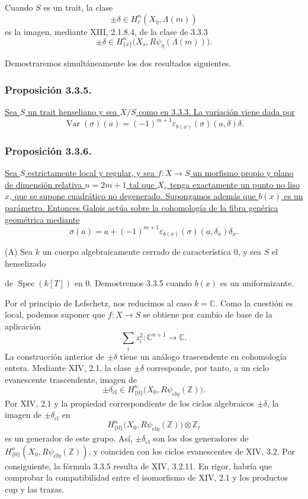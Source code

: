 Cuando $S$ es un trait, la clase
\[
\pm\delta\in H_c^n(X_{\bar\eta},\Lambda(m))
\]
es la imagen, mediante XIII, 2.1.8.4, de la clase de 3.3.3
\[
\pm\delta\in
H^n_{\{x\}}\bigl(X_s,R\psi_{\bar\eta}(\Lambda(m))\bigr).
\]

Demostraremos simultáneamente los dos resultados siguientes.

\subsubsection*{Proposición 3.3.5.}
\underline{Sea $S$ un trait henseliano y sea $X/S$ como en 3.3.3. La
variación viene dada por}
\[
\operatorname{Var}(\sigma)(a)
=(-1)^{m+1}\varepsilon_{b(x)}(\sigma)(a,\delta)\delta.
\]

\subsubsection*{Proposición 3.3.6.}
\underline{Sea $S$ estrictamente local y regular, y sea
$f:X\to S$ un morfismo propio y plano de dimensión relativa
$n=2m+1$ tal que $X_s$ tenga exactamente un punto no liso $x$, que se
supone cuadrático no degenerado. Supongamos además que $b(x)$ es un
parámetro. Entonces Galois actúa sobre la cohomología de la fibra
genérica geométrica mediante}
\[
\sigma(a)=a+(-1)^{m+1}
\varepsilon_{b(x)}(\sigma)(a,\delta_x)\delta_x.
\]

\medskip
\noindent\textup{(A)}
Sea $k$ un cuerpo algebraicamente cerrado de característica $0$, y sea
$S$ el henselizado

\pageoriginale

de $\operatorname{Spec}(k[T])$ en $0$. Demostremos 3.3.5 cuando $b(x)$
es un uniformizante.

Por el principio de Lefschetz, nos reducimos al caso $k=\mathbb C$.
Como la cuestión es local, podemos suponer que $f:X\to S$ se obtiene
por cambio de base de la aplicación
\[
\sum_i z_i^2:\mathbb C^{n+1}\longrightarrow\mathbb C.
\]
La construcción anterior de $\pm\delta$ tiene un análogo trascendente
en cohomología entera. Mediante XIV, 2.1, la clase $\pm\delta$
corresponde, por tanto, a un ciclo evanescente trascendente, imagen de
\[
\pm\delta_{\mathrm{cl}}
\in H^n_{\{0\}}\bigl(X_0,R\psi_{\mathrm{cl}\eta}(\mathbb Z)\bigr).
\]
Por XIV, 2.1 y la propiedad correspondiente de los ciclos algebraicos
$\pm\delta$, la imagen de $\pm\delta_{\mathrm{cl}}$ en
\[
H^n_{\{0\}}\bigl(X_0,R\psi_{\mathrm{cl}\eta}(\mathbb Z)\bigr)
\otimes\mathbb Z_\ell
\]
es un generador de este grupo. Así, $\pm\delta_{\mathrm{cl}}$ son los
dos generadores de
$H^n_{\{0\}}(X_0,R\psi_{\mathrm{cl}\eta}(\mathbb Z))$, y coinciden con
los ciclos evanescentes de XIV, 3.2. Por consiguiente, la fórmula 3.3.5
resulta de XIV, 3.2.11. En rigor, habría que comprobar la compatibilidad
entre el isomorfismo de XIV, 2.1 y los productos cup y las trazas.

